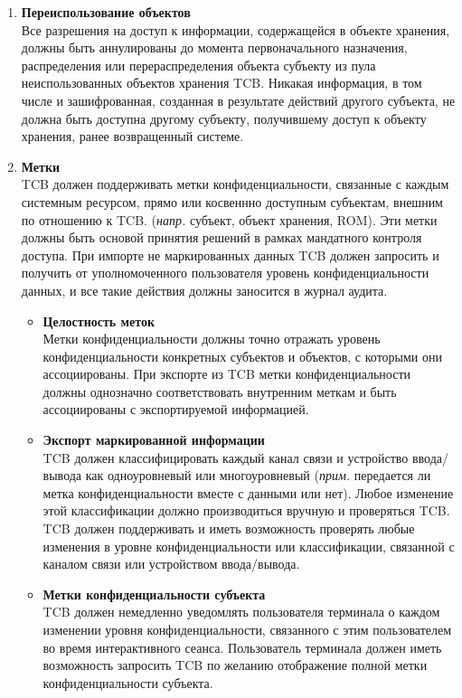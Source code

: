 \begin{enumerate}
\begin{enumerate}
\begin{enumerate}
			\item{\textbf{Переиспользование объектов}}\\
			Все разрешения на доступ к информации, содержащейся в объекте хранения, должны быть аннулированы до момента первоначального назначения, распределения или перераспределения объекта
			субъекту из пула неиспользованных объектов хранения TCB. Никакая информация, в том числе и зашифрованная, созданная в результате действий другого субъекта, не должна быть доступна
			другому субъекту, получившему доступ к объекту хранения, ранее возвращенный системе.
			\item{\textbf{Метки}}\\
			TCB должен поддерживать метки конфиденциальности, связанные с каждым системным ресурсом, прямо или косвеннно доступным субъектам, внешним по отношению к TCB. (\textit{напр.} субъект, 
			объект хранения, ROM). Эти метки должны быть основой принятия решений в рамках мандатного контроля доступа. При импорте не маркированных данных TCB должен запросить и получить от 
			уполномоченного пользователя уровень конфиденциальности данных, и все такие действия должны заносится в журнал аудита.
			\begin{itemize}
				\item{\textbf{Целостность меток}}\\
				Метки конфиденциальности должны точно отражать уровень конфиденциальности конкретных субъектов и объектов, с которыми они ассоциированы. При экспорте из TCB метки конфиденциальности
				должны однозначно соответствовать внутренним меткам и быть ассоциированы с экспортируемой информацией.
				\item{\textbf{Экспорт маркированной информации}}\\
				TCB должен классифицировать каждый канал связи и устройство ввода/вывода как одноуровневый или многоуровневый (\textit{прим. } передается ли метка конфиденциальности вместе с данными
				или нет). Любое изменение этой классификации должно производиться вручную и проверяться TCB. TCB должен поддерживать и иметь возможность проверять любые изменения в уровне
				конфиденциальности или классификации, связанной с каналом связи или устройством ввода/вывода.
				\item{\textbf{Метки конфиденциальности субъекта}}\\
				TCB должен немедленно уведомлять пользователя терминала о каждом изменении уровня конфиденциальности, связанного с этим пользователем во время интерактивного сеанса. Пользователь 
				терминала должен иметь возможность запросить TCB по желанию отображение полной метки конфиденциальности субъекта.

\end{itemize}
\end{enumerate}
\end{enumerate}
\end{enumerate}
